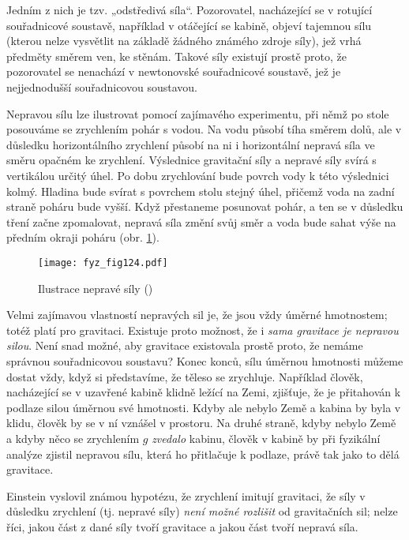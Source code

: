 {    Jedním z nich je tzv. „odstředivá síla“. Pozorovatel, nacházející se v rotující souřadnicové 
    soustavě, například v otáčející se kabině, objeví tajemnou sílu (kterou nelze vysvětlit na 
    základě žádného známého zdroje síly), jež vrhá předměty směrem ven, ke stěnám. Takové síly 
    existují prostě proto, že pozorovatel se nenachází v newtonovské souřadnicové soustavě, jež je 
    nejjednodušší souřadnicovou soustavou.
    
    Nepravou sílu lze ilustrovat pomocí zajímavého experimentu, při němž po stole posouváme se 
    zrychlením pohár s vodou. Na vodu působí tíha směrem dolů, ale v důsledku horizontálního 
    zrychlení působí na ni i horizontální nepravá síla ve směru opačném ke zrychlení. Výslednice 
    gravitační síly a nepravé síly svírá s vertikálou určitý úhel. Po dobu zrychlování bude povrch 
    vody k této výslednici kolmý. Hladina bude svírat s povrchem stolu stejný úhel, přičemž voda na 
    zadní straně poháru bude vyšší. Když přestaneme posunovat pohár, a ten se v důsledku tření 
    začne zpomalovat, nepravá síla změní svůj směr a voda bude sahat výše na předním okraji poháru 
    (obr. \ref{fyz:fig124}).
    
    \begin{figure}[ht!]  %
      \centering
      \texttt{[image: fyz\_fig124.pdf]}
      \caption{Ilustrace nepravé síly
              (\cite[s.~181]{Feynman01})}
      \label{fyz:fig124}
    \end{figure}
    Velmi zajímavou vlastností nepravých sil je, že jsou vždy úměrné hmotnostem; totéž platí pro 
    gravitaci. Existuje proto možnost, že i \emph{sama gravitace je nepravou silou}. Není snad 
    možné, aby gravitace existovala prostě proto, že nemáme správnou souřadnicovou soustavu? Konec 
    konců, sílu úměrnou hmotnosti můžeme dostat vždy, když si představíme, že těleso se zrychluje. 
    Například člověk, nacházející se v uzavřené kabině klidně ležící na Zemi, zjišťuje, že je 
    přitahován k podlaze silou úměrnou své hmotnosti. Kdyby ale nebylo Země a kabina by byla v 
    klidu, člověk by se v ní vznášel v prostoru. Na druhé straně, kdyby nebylo Země a kdyby něco se 
    zrychlením \(g\) \emph{zvedalo} kabinu, člověk v kabině by při fyzikální analýze zjistil 
    nepravou sílu, která ho přitlačuje k podlaze, právě tak jako to dělá gravitace.
    
    Einstein vyslovil známou hypotézu, že zrychlení imitují gravitaci, že síly v důsledku zrychlení 
    (tj. nepravé síly) \emph{není možné rozlišit} od gravitačních sil; nelze říci, jakou část z 
    dané síly tvoří gravitace a jakou část tvoří nepravá síla.
    
}
